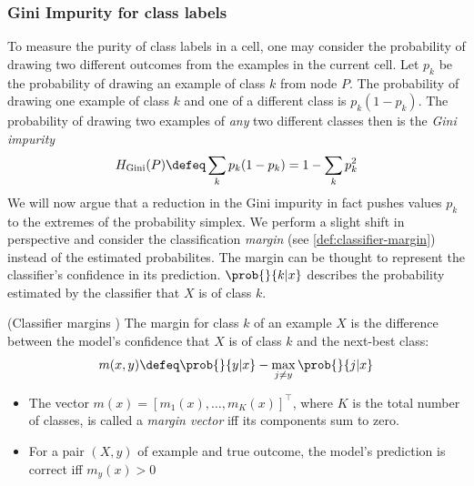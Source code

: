 \documentclass[../main.tex]{subfiles}
\begin{document}
\subsubsection{Gini Impurity for class labels}
\label{sec:gini-impurity}



To measure the purity of class labels in a cell, one may consider the probability of drawing two different outcomes from the examples in the current cell. 
Let $p_{k}$ be the probability of drawing an example of class $k$ from node $P$.
The probability of drawing one example of class $k$ and one of a different class is $p_{k}(1-p_{k})$.
The probability of drawing two examples of \textit{any} two different classes then is the \textit{Gini impurity}
$$
H_{\text{Gini}}(P) \defeq \sum_{k}p_{k}(1-p_{k}) = 1 - \sum_k p_k^2
$$
We will now argue that a reduction in the Gini impurity in fact pushes values $p_{k}$ to the extremes of the probability simplex. 
We perform a slight shift in perspective and consider the classification \textit{margin} (see \ref{def:classifier-margin}) instead of the estimated probabilites. 
 The margin can be thought to represent the classifier's confidence in its prediction. $\prob{}{k|x}$ describes the probability estimated by the classifier that $X$ is of class $k$.

\begin{definition} (Classifier margins \cite{tibshirani_ElementsStatisticalLearning_2017}) The margin for class $k$ of an example $X$ is the difference between the model's confidence that $X$ is of class $k$ and the next-best class:
$$
m(x,y) \defeq \prob{}{y|x} - \max_{j\not=y} \prob{}{j|x}
$$
\begin{itemize}
    \item The vector $m(x) = [m_{1}(x), \dots, m_{K}(x)]^\top$, where $K$ is the total number of classes, is called a \textit{margin vector} iff its components sum to zero. 
    \item For a pair $(X,y)$ of example and true outcome, the model's prediction is correct iff $m_y(x) > 0$ 
\end{itemize}
\label{def:classifier-margin}
\end{definition}
\end{document}
